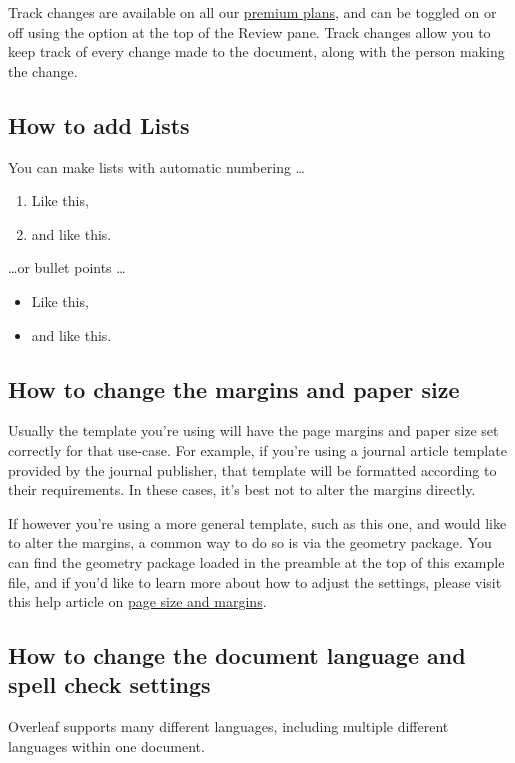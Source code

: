 \documentclass{article}
\begin{document}
Track changes are available on all our
\href{https://www.overleaf.com/user/subscription/plans}{premium plans}, and can
be toggled on or off using the option at the top of the Review pane. Track
changes allow you to keep track of every change made to the document, along with
the person making the change.

\subsection{How to add Lists}

You can make lists with automatic numbering \dots

\begin{enumerate}
\item Like this,
\item and like this.
\end{enumerate}
\dots or bullet points \dots
\begin{itemize}
\item Like this,
\item and like this.
\end{itemize}

\subsection{How to change the margins and paper size}

Usually the template you're using will have the page margins and paper size set
correctly for that use-case. For example, if you're using a journal article
template provided by the journal publisher, that template will be formatted
according to their requirements. In these cases, it's best not to alter the
margins directly.

If however you're using a more general template, such as this one, and would
like to alter the margins, a common way to do so is via the geometry package.
You can find the geometry package loaded in the preamble at the top of this
example file, and if you'd like to learn more about how to adjust the settings,
please visit this help article on
\href{https://www.overleaf.com/learn/latex/page_size_and_margins}{page size and
margins}.

\subsection{How to change the document language and spell check settings}

Overleaf supports many different languages, including multiple different
languages within one document.
\end{document}
